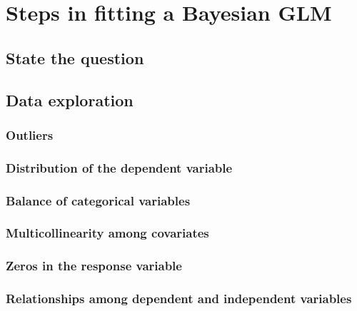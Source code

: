 \documentclass[
]{book}
\begin{document}
\hypertarget{bern-glm-steps}{%
\section{Steps in fitting a Bayesian GLM}\label{bern-glm-steps}}

\hypertarget{cc-question}{%
\subsection{State the question}\label{cc-question}}

\hypertarget{cc-eda}{%
\subsection{Data exploration}\label{cc-eda}}

\hypertarget{cc-outliers}{%
\subsubsection{Outliers}\label{cc-outliers}}

\hypertarget{bern-dist}{%
\subsubsection{Distribution of the dependent variable}\label{bern-dist}}

\hypertarget{bern-balance}{%
\subsubsection{Balance of categorical variables}\label{bern-balance}}

\hypertarget{bern-collin}{%
\subsubsection{Multicollinearity among covariates}\label{bern-collin}}

\hypertarget{bern-zeros}{%
\subsubsection{Zeros in the response variable}\label{bern-zeros}}

\hypertarget{bern-rels}{%
\subsubsection{Relationships among dependent and independent
variables}\label{bern-rels}}
\end{document}
